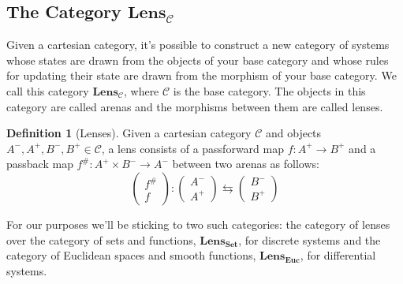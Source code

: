 \documentclass[12pt]{article}
\theoremstyle{definition}
\newtheorem{definition}{Definition}
\begin{document}
\subsection*{The Category $\textbf{Lens}_{\mathcal{C}}$}
Given a cartesian category, it's possible to construct a new category of systems whose states are drawn from the objects of your base category and whose rules for updating their state are drawn from the morphism of your base category.
We call this category $\textbf{Lens}_{\mathcal{C}}$, where $\mathcal{C}$ is the base category.
The objects in this category are called arenas and the morphisms between them are called lenses.

\begin{definition}[Lenses]
    Given a cartesian category $\mathcal{C}$ and objects $A^-, A^+, B^-, B^+ \in\mathcal{C}$, a lens consists of a passforward map $f:A^+\rightarrow B^+$ and a passback map $f^\#:A^+ \times B^- \rightarrow A^-$ between two arenas as follows:
    \[
        \begin{pmatrix}f^{\#}\\f\end{pmatrix}:\begin{pmatrix}A^-\\A^+\end{pmatrix}\leftrightarrows\begin{pmatrix}B^-\\B^+\end{pmatrix}
    \]
\end{definition}

For our purposes we'll be sticking to two such categories: the category of lenses over the category of sets and functions, $\textbf{Lens}_{\textbf{Set}}$, for discrete systems and the category of Euclidean spaces and smooth functions, $\textbf{Lens}_\textbf{Euc}$, for differential systems.
\end{document}

